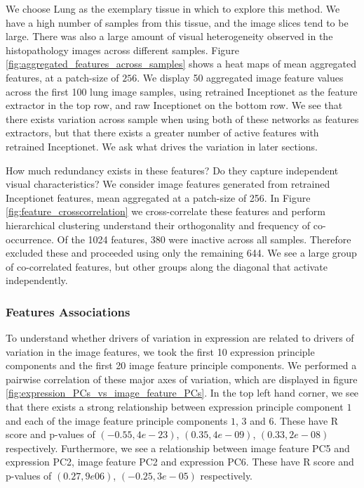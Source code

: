 \documentclass[graybox]{svmult}
\begin{document}
We choose Lung as the exemplary tissue in which to explore this method. We have a high number of samples from this tissue, and the image slices tend to be large. There was also a large amount of visual heterogeneity observed in the histopathology images across different samples. Figure \ref{fig:aggregated_features_across_samples} shows a heat maps of mean aggregated features, at a patch-size of $256$. We display 50 aggregated image feature values across the first 100 lung image samples, using retrained Inceptionet as the feature extractor in the top row, and raw Inceptionet on the bottom row. We see that there exists variation across sample when using both of these networks as features extractors, but that there exists a greater number of active features with retrained Inceptionet. We ask what drives the variation in later sections.

How much redundancy exists in these features? Do they capture independent visual characteristics? We consider image features generated from retrained Inceptionet features, mean aggregated at a patch-size of 256. In Figure \ref{fig:feature_crosscorrelation} we cross-correlate these features and perform hierarchical clustering understand their orthogonality and frequency of co-occurrence. Of the 1024 features, 380 were inactive across all samples. Therefore excluded these and proceeded using only the remaining 644. We see a large group of co-correlated features, but other groups along the diagonal that activate independently.

\subsubsection{Features Associations}

To understand whether drivers of variation in expression are related to drivers of variation in the image features, we took the first 10 expression principle components and the first 20 image feature principle components. We performed a pairwise correlation of these major axes of variation, which are displayed in figure \ref{fig:expression_PCs_vs_image_feature_PCs}. In the top left hand corner, we see that there exists a strong relationship between expression principle component $1$ and each of the image feature principle components $1$, $3$ and $6$. These have R score and p-values of $(-0.55, 4e-23)$, $(0.35, 4e-09)$, $(0.33, 2e-08)$ respectively. Furthermore, we see a relationship between image feature PC5 and expression PC2, image feature PC2 and expression PC6. These have R score and p-values of $(0.27, 9e06)$, $(-0.25, 3e-05) $ respectively.
\end{document}
